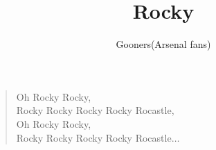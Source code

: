 \documentclass[a4paper,12pt]{article}
\title{Rocky}
\author{Gooners(Arsenal fans)}
\date{}
\begin{document}
	
	\maketitle
	
	\begin{verse}
		
		Oh Rocky Rocky, \\
		Rocky Rocky Rocky Rocky Rocastle, \\
		Oh Rocky Rocky, \\
		Rocky Rocky Rocky Rocky Rocastle$\ldots$
		
	\end{verse}
	
\end{document}

